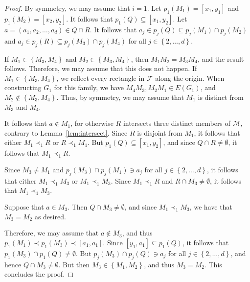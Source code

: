 \documentclass[12pt]{amsart}
\theoremstyle{plain}
\theoremstyle{definition}
\theoremstyle{remark}
\newcommand{\F}{\mathcal{F}}
\newcommand{\M}{\mathcal{M}}
\newcommand{\sset}[1]{\left\{#1\right\}}
\begin{document}
\begin{proof} By symmetry, we may assume that $i=1$. Let $p_1(M_1) = [x_1,y_1]$ and $p_1(M_2) = [x_2,y_2]$. It follows that $p_1(Q) \subseteq [x_1,y_2]$. Let $a = (a_1, a_2, \dots, a_d) \in Q \cap R$. It follows that $a_j \in p_j(Q) \subseteq p_j(M_1) \cap p_j(M_2)$ and $a_j \in p_j(R) \subseteq p_j(M_3) \cap p_j(M_4)$ for all $j \in \sset{2, \dots, d}$. 

If $M_1 \in \sset{M_3, M_4}$ and $M_2 \in \sset{M_3, M_4}$, then $M_1M_2 = M_3M_4$, and the result follows. Therefore, we may assume that this does not happen. If $M_1 \in \sset{M_3, M_4}$, we reflect every rectangle in $\F$ along the origin. When constructing $G_1$ for this family, we have $M_4M_3, M_2M_1 \in E(G_1)$, and $M_2 \not\in \sset{M_3, M_4}$. Thus, by symmetry, we may assume that $M_1$ is distinct from $M_3$ and $M_4$. 

It follows that $a \not\in M_1$, for otherwise $R$ intersects three distinct members of $\M$, contrary to Lemma~\ref{lem:intersect}. Since $R$ is disjoint from $M_1$, it follows that either $M_1 \prec_1 R$ or $R \prec_1 M_1$. But $p_1(Q) \subseteq [x_1,y_2]$, and since $Q \cap R \neq \emptyset$, it follows that $M_1 \prec_1 R$.

Since $M_3 \neq M_1$ and $p_j(M_3) \cap p_j(M_1) \ni a_j$ for all $j \in \sset{2, \dots, d}$, it follows that either $M_1 \prec_1 M_3$ or $M_1 \prec_1 M_3$. Since $M_1 \prec_1 R$ and $R \cap M_3 \neq \emptyset$, it follows that $M_1 \prec_1 M_3$. 

Suppose that $a \in M_3$. Then $Q \cap M_3 \neq \emptyset$, and since $M_1 \prec_1 M_3$, we have that $M_3 = M_2$ as desired. 

Therefore, we may assume that $a \not\in M_3$, and thus $p_1(M_1) \prec p_1(M_3) \prec [a_1,a_1]$. Since $[y_1, a_1] \subseteq p_1(Q)$, it follows that $p_1(M_3) \cap p_1(Q) \neq \emptyset$. But $p_j(M_3) \cap p_j(Q) \ni a_j$ for all $j \in \sset{2, \dots, d}$, and hence $Q \cap M_3 \neq \emptyset$. But then $M_3 \in \sset{M_1, M_2}$, and thus $M_3 = M_2$. This concludes the proof. 
\end{proof}
\end{document}
